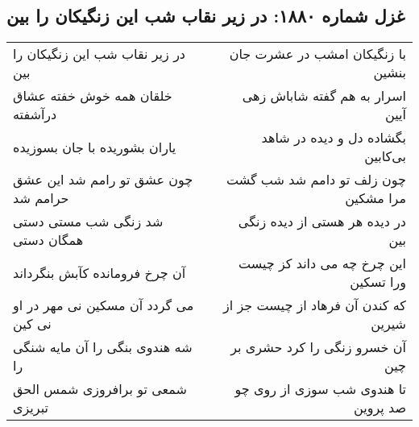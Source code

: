 \begin{center}
\section*{غزل شماره ۱۸۸۰: در زیر نقاب شب این زنگیکان را بین}
\label{sec:1880}
\begin{longtable}{l p{0.5cm} r}
در زیر نقاب شب این زنگیکان را بین
&&
با زنگیکان امشب در عشرت جان بنشین
\\
خلقان همه خوش خفته عشاق درآشفته
&&
اسرار به هم گفته شاباش زهی آیین
\\
یاران بشوریده با جان بسوزیده
&&
بگشاده دل و دیده در شاهد بی‌کابین
\\
چون عشق تو رامم شد این عشق حرامم شد
&&
چون زلف تو دامم شد شب گشت مرا مشکین
\\
شد زنگی شب مستی دستی همگان دستی
&&
در دیده هر هستی از دیده زنگی بین
\\
آن چرخ فرومانده کآبش بنگرداند
&&
این چرخ چه می داند کز چیست ورا تسکین
\\
می گردد آن مسکین نی مهر در او نی کین
&&
که کندن آن فرهاد از چیست جز از شیرین
\\
شه هندوی بنگی را آن مایه شنگی را
&&
آن خسرو زنگی را کرد حشری بر چین
\\
شمعی تو برافروزی شمس الحق تبریزی
&&
تا هندوی شب سوزی از روی چو صد پروین
\\
\end{longtable}
\end{center}

